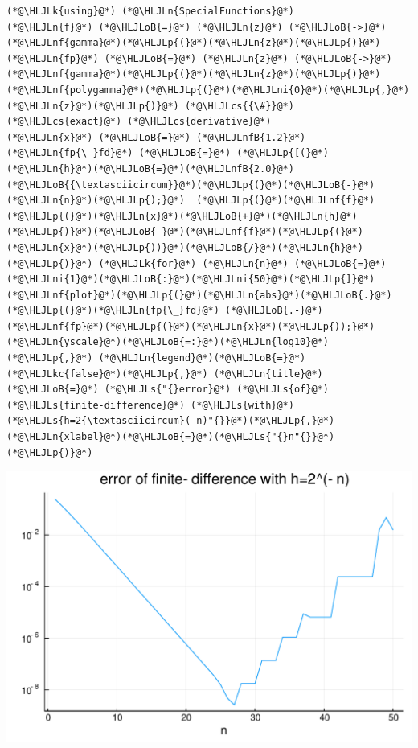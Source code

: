 \documentclass[12pt,a4paper]{article}
\newcommand{\HLJLk}[1]{\textcolor[RGB]{148,91,176}{\textbf{#1}}}
\newcommand{\HLJLkc}[1]{\textcolor[RGB]{59,151,46}{\textit{#1}}}
\newcommand{\HLJLn}[1]{#1}
\newcommand{\HLJLnf}[1]{\textcolor[RGB]{66,102,213}{#1}}
\newcommand{\HLJLs}[1]{\textcolor[RGB]{201,61,57}{#1}}
\newcommand{\HLJLnfB}[1]{\textcolor[RGB]{59,151,46}{#1}}
\newcommand{\HLJLni}[1]{\textcolor[RGB]{59,151,46}{#1}}
\newcommand{\HLJLoB}[1]{\textcolor[RGB]{102,102,102}{\textbf{#1}}}
\newcommand{\HLJLp}[1]{#1}
\newcommand{\HLJLcs}[1]{\textcolor[RGB]{153,153,119}{\textit{#1}}}
\begin{document}
\begin{lstlisting}
(*@\HLJLk{using}@*) (*@\HLJLn{SpecialFunctions}@*)
(*@\HLJLn{f}@*) (*@\HLJLoB{=}@*) (*@\HLJLn{z}@*) (*@\HLJLoB{->}@*) (*@\HLJLnf{gamma}@*)(*@\HLJLp{(}@*)(*@\HLJLn{z}@*)(*@\HLJLp{)}@*)
(*@\HLJLn{fp}@*) (*@\HLJLoB{=}@*) (*@\HLJLn{z}@*) (*@\HLJLoB{->}@*) (*@\HLJLnf{gamma}@*)(*@\HLJLp{(}@*)(*@\HLJLn{z}@*)(*@\HLJLp{)}@*)(*@\HLJLnf{polygamma}@*)(*@\HLJLp{(}@*)(*@\HLJLni{0}@*)(*@\HLJLp{,}@*)(*@\HLJLn{z}@*)(*@\HLJLp{)}@*) (*@\HLJLcs{{\#}}@*) (*@\HLJLcs{exact}@*) (*@\HLJLcs{derivative}@*) 
(*@\HLJLn{x}@*) (*@\HLJLoB{=}@*) (*@\HLJLnfB{1.2}@*)
(*@\HLJLn{fp{\_}fd}@*) (*@\HLJLoB{=}@*) (*@\HLJLp{[(}@*)(*@\HLJLn{h}@*)(*@\HLJLoB{=}@*)(*@\HLJLnfB{2.0}@*)(*@\HLJLoB{{\textasciicircum}}@*)(*@\HLJLp{(}@*)(*@\HLJLoB{-}@*)(*@\HLJLn{n}@*)(*@\HLJLp{);}@*)  (*@\HLJLp{(}@*)(*@\HLJLnf{f}@*)(*@\HLJLp{(}@*)(*@\HLJLn{x}@*)(*@\HLJLoB{+}@*)(*@\HLJLn{h}@*)(*@\HLJLp{)}@*)(*@\HLJLoB{-}@*)(*@\HLJLnf{f}@*)(*@\HLJLp{(}@*)(*@\HLJLn{x}@*)(*@\HLJLp{))}@*)(*@\HLJLoB{/}@*)(*@\HLJLn{h}@*)(*@\HLJLp{)}@*) (*@\HLJLk{for}@*) (*@\HLJLn{n}@*) (*@\HLJLoB{=}@*) (*@\HLJLni{1}@*)(*@\HLJLoB{:}@*)(*@\HLJLni{50}@*)(*@\HLJLp{]}@*)
(*@\HLJLnf{plot}@*)(*@\HLJLp{(}@*)(*@\HLJLn{abs}@*)(*@\HLJLoB{.}@*)(*@\HLJLp{(}@*)(*@\HLJLn{fp{\_}fd}@*) (*@\HLJLoB{.-}@*) (*@\HLJLnf{fp}@*)(*@\HLJLp{(}@*)(*@\HLJLn{x}@*)(*@\HLJLp{));}@*) (*@\HLJLn{yscale}@*)(*@\HLJLoB{=:}@*)(*@\HLJLn{log10}@*)(*@\HLJLp{,}@*) (*@\HLJLn{legend}@*)(*@\HLJLoB{=}@*)(*@\HLJLkc{false}@*)(*@\HLJLp{,}@*) (*@\HLJLn{title}@*) (*@\HLJLoB{=}@*) (*@\HLJLs{"{}error}@*) (*@\HLJLs{of}@*) (*@\HLJLs{finite-difference}@*) (*@\HLJLs{with}@*) (*@\HLJLs{h=2{\textasciicircum}(-n)"{}}@*)(*@\HLJLp{,}@*) (*@\HLJLn{xlabel}@*)(*@\HLJLoB{=}@*)(*@\HLJLs{"{}n"{}}@*)(*@\HLJLp{)}@*)
\end{lstlisting}

\includegraphics[width=\linewidth]{figures/Lecture6_6_1.pdf}
\end{document}
